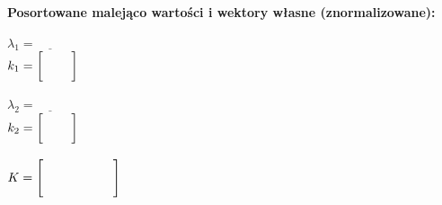 \documentclass[a4paper,11pt]{article}
\newcommand{\myEmptySpace}{\hspace{0.8cm}}
\begin{document}
\bigskip
\noindent\textbf{Posortowane malejąco wartości i wektory własne (znormalizowane):}\medskip\\
\begin{minipage}{0.2\textwidth}
$\lambda_1 = \underline{~~~~~~~~~~}$\bigskip\\
$k_1 = \begin{bmatrix} \myEmptySpace{} \\ \myEmptySpace{} \end{bmatrix}$
\end{minipage}
\hspace{0.05\textwidth}
\begin{minipage}{0.2\textwidth}
	$\lambda_2 = \underline{~~~~~~~~~~}$\bigskip\\
	$k_2 = \begin{bmatrix} \myEmptySpace{} \\ \myEmptySpace{} \end{bmatrix}$
\end{minipage}
\hspace{0.05\textwidth}
\begin{minipage}{0.3\textwidth}
	$K = \begin{bmatrix}
	\myEmptySpace{} & \myEmptySpace{}\vspace{0.3cm}\\
	\myEmptySpace{} & \myEmptySpace{}
	\end{bmatrix}$
\end{minipage}


\vspace{1cm}
\end{document}
